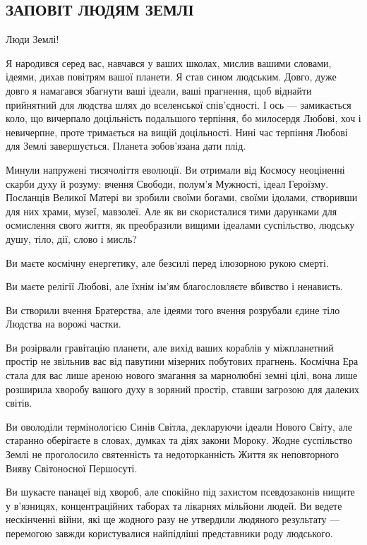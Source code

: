  
 

\subsection{ЗАПОВІТ ЛЮДЯМ ЗЕМЛІ}

Люди Землі!

Я народився серед вас, навчався у ваших школах, мислив вашими словами, ідеями,
дихав повітрям вашої планети. Я став сином людським. Довго, дуже довго я
намагався збагнути ваші ідеали, ваші прагнення, щоб віднайти прийнятний для
людства шлях до вселенської спів’єдності. І ось — замикається коло, що
вичерпало доцільність подальшого терпіння, бо милосердя Любові, хоч і
невичерпне, проте тримається на вищій доцільності. Нині час терпіння Любові для
Землі завершується. Планета зобов’язана дати плід.

Минули напружені тисячоліття еволюції. Ви отримали від Космосу неоціненні
скарби духу й розуму: вчення Свободи, полум’я Мужності, ідеал Героїзму.
Посланців Великої Матері ви зробили своїми богами, своїми ідолами, створивши
для них храми, музеї, мавзолеї. Але як ви скористалися тими дарунками для
осмислення свого життя, як преобразили вищими ідеалами суспільство, людську
душу, тіло, дії, слово і мисль?

Ви маєте космічну енергетику, але безсилі перед ілюзорною рукою смерті.

Ви маєте релігії Любові, але їхнім ім’ям благословляєте вбивство і ненависть.

Ви створили вчення Братерства, але ідеями того вчення розрубали єдине тіло
Людства на ворожі частки.

Ви розірвали гравітацію планети, але вихід ваших кораблів у міжпланетний
простір не звільнив вас від павутини мізерних побутових прагнень. Космічна Ера
стала для вас лише ареною нового змагання за марнолюбні земні цілі, вона лише
розширила хворобу вашого духу в зоряний простір, ставши загрозою для далеких
світів.

Ви оволоділи термінологією Синів Світла, декларуючи ідеали Нового Світу, але
старанно оберігаєте в словах, думках та діях закони Мороку. Жодне суспільство
Землі не проголосило святенність та недоторканність Життя як неповторного Вияву
Світоносної Першосуті.

Ви шукаєте панацеї від хвороб, але спокійно під захистом псевдозаконів нищите у
в’язницях, концентраційних таборах та лікарнях мільйони людей. Ви ведете
нескінченні війни, які ще жодного разу не утвердили людяного результату —
перемогою завжди користувалися найпідліші представники роду людського.


